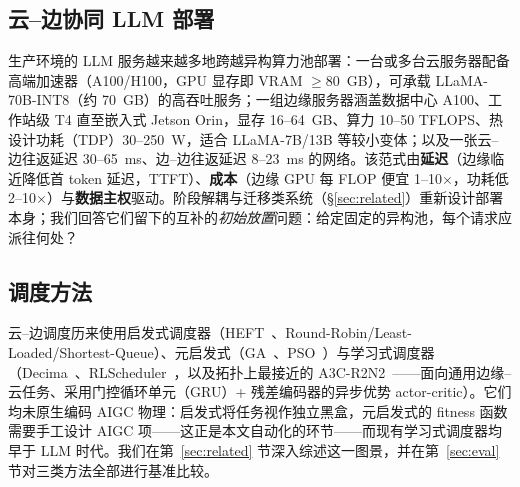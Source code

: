 \subsection{云--边协同 LLM 部署}
\label{sec:bg-cloudedge}

生产环境的 LLM 服务越来越多地跨越异构算力池部署：一台或多台云服务器配备高端加速器（A100/H100，GPU 显存即 VRAM $\ge$80~GB），可承载 LLaMA-70B-INT8（约 70~GB）的高吞吐服务；一组边缘服务器涵盖数据中心 A100、工作站级 T4 直至嵌入式 Jetson Orin，显存 16--64~GB、算力 10--50 TFLOPS、热设计功耗（TDP）30--250~W，适合 LLaMA-7B/13B 等较小变体；以及一张云--边往返延迟 30--65~ms、边--边往返延迟 8--23~ms 的网络。该范式由\textbf{延迟}（边缘临近降低首 token 延迟，TTFT）、\textbf{成本}（边缘 GPU 每 FLOP 便宜 1--10$\times$，功耗低 2--10$\times$）与\textbf{数据主权}驱动。阶段解耦与迁移类系统（\S\ref{sec:related}）重新设计部署本身；我们回答它们留下的互补的\emph{初始放置}问题：给定固定的异构池，每个请求应派往何处？

\subsection{调度方法}
\label{sec:bg-sched}

云--边调度历来使用启发式调度器（HEFT~\cite{topcuoglu2002heft}、Round-Robin/Least-Loaded/Shortest-Queue）、元启发式（GA~\cite{holland1975adaptation}、PSO~\cite{kennedy1995pso}）与学习式调度器（Decima~\cite{mao2019decima}、RLScheduler~\cite{zhang2020rlscheduler}，以及拓扑上最接近的 A3C-R2N2~\cite{tuli2022a3cr2n}——面向通用边缘--云任务、采用门控循环单元（GRU）+ 残差编码器的异步优势 actor-critic）。它们均未原生编码 AIGC 物理：启发式将任务视作独立黑盒，元启发式的 fitness 函数需要手工设计 AIGC 项——这正是本文自动化的环节——而现有学习式调度器均早于 LLM 时代。我们在第~\ref{sec:related} 节深入综述这一图景，并在第~\ref{sec:eval} 节对三类方法全部进行基准比较。

